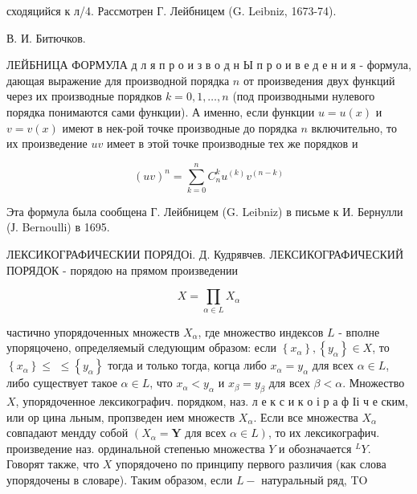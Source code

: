 \documentclass[10pt]{article}
\begin{document}
сходяцийся к л/4. Рассмотрен Г. Лейбницем (G. Leibniz, 1673-74).



В. И. Битючков.



ЛЕЙБНИЦА ФОРМУЛА д л я п р о и з в о д н Ы п р о и в е д е н и я - формула, дающая выражение для производной порядка $n$ от произведения двух функций через их производные порядков $k=0,1, \ldots, n$ (под производными нулевого порядка понимаются сами функции). А именно, если функции $u=u(x)$ и $v=v(x)$ имеют в нек-рой точке производные до порядка $n$ включительно, то их произведение $u v$ имеет в этой точке производные тех же порядков и



\[

(u v)^{n}=\sum_{k=0}^{n} C_{n}^{k} u^{(k)} v^{(n-k)}

\]



Эта формула была сообщена Г. Лейбницем (G. Leibniz) в письме к И. Бернулли (Ј. Bernoulli) в 1695.



ЛЕКСИКОГРАФИЧЕСКИИ ПОРЯДОі. Д. Кудрявчев. ЛЕКСИКОГРАФИЧЕСКИЙ ПОРЯДОК - порядою на прямом произведении



\[

X=\prod_{\alpha \in L} X_{\alpha}

\]



частично упорядоченных множеств $X_{\alpha}$, где множество индексов $L$ - вполне упоряцочено, определяемый следующим образом: если $\left\{x_{\alpha}\right\},\left\{y_{\alpha}\right\} \in X$, то $\left\{x_{\alpha}\right\} \leqslant$ $\leqslant\left\{y_{\alpha}\right\}$ тогда и только тогда, когца либо $x_{\alpha}=y_{\alpha}$ для всех $\alpha \in L$, либо существует такое $\alpha \in L$, что $x_{\alpha}<y_{\alpha}$ и $x_{\beta}=y_{\beta}$ для всех $\beta<\alpha$. Множество $X$, упорядоченное лексикографич. порядком, наз. л е к с и к о і р а ф Іі ч е ским, или ор цина льным, пропзведен ием множеств $X_{\alpha}$. Если все множества $X_{\alpha}$ совпадают мендду собой $\left(X_{\alpha}=\boldsymbol{Y}\right.$ для всех $\left.\alpha \in L\right)$, то их лексикографич. произведение наз. ординальной степенью множества $Y$ и обозначается ${ }^{L} Y$. Говорят также, что $X$ упорядочено по принципу первого различия (как слова упорядочены в словаре). Таким образом, если $L-$ натуральный ряд, TO
\end{document}
